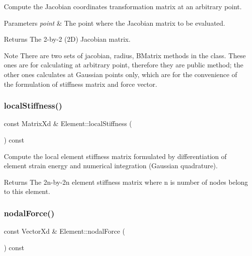 Compute the Jacobian coordinates transformation matrix at an arbitrary point. 


\begin{DoxyParams}{Parameters}
{\em point} & The point where the Jacobian matrix to be evaluated. \\
\hline
\end{DoxyParams}
\begin{DoxyReturn}{Returns}
The 2-\/by-\/2 (2D) Jacobian matrix.
\end{DoxyReturn}
\begin{DoxyNote}{Note}
There are two sets of jacobian, radius, B\+Matrix methods in the class. These ones are for calculating at arbitrary point, therefore they are public method; the other ones calculates at Gaussian points only, which are for the convenience of the formulation of stiffness matrix and force vector. 
\end{DoxyNote}
\mbox{\label{class_element_a24c9d2dd309a28a8891d6b710a8aa0c9}} 
\subsubsection{\texorpdfstring{local\+Stiffness()}{localStiffness()}}
{\footnotesize\ttfamily const Matrix\+Xd \& Element\+::local\+Stiffness (\begin{DoxyParamCaption}{ }\end{DoxyParamCaption}) const}



Compute the local element stiffness matrix formulated by differentiation of element strain energy and numerical integration (Gaussian quadrature). 

\begin{DoxyReturn}{Returns}
The 2n-\/by-\/2n element stiffness matrix where n is number of nodes belong to this element. 
\end{DoxyReturn}
\mbox{\label{class_element_ac9d07ee9676f15296a097ab97fd5ef7e}} 
\subsubsection{\texorpdfstring{nodal\+Force()}{nodalForce()}}
{\footnotesize\ttfamily const Vector\+Xd \& Element\+::nodal\+Force (\begin{DoxyParamCaption}{ }\end{DoxyParamCaption}) const}



